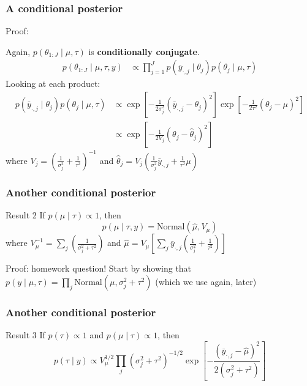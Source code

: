 \documentclass{beamer}
\begin{document}
\begin{frame}
\frametitle{A conditional posterior}

Proof:

Again, $p(\theta_{1:J} \mid \mu, \tau)$ is {\bf conditionally conjugate}. 
\begin{align*}
p(\theta_{1:J} \mid \mu, \tau, y) &\propto \prod_{j=1}^J p(\bar{y}_{\cdot,j} \mid \theta_j) p(\theta_j \mid \mu, \tau) 
\end{align*}
Looking at each product:
\begin{align*}
p(\bar{y}_{\cdot,j} \mid \theta_j) p(\theta_j \mid \mu, \tau) &\propto \exp\left[-\frac{1}{2 \sigma_j^2} \left(\bar{y}_{\cdot,j} - \theta_j \right)^2 \right]\exp\left[-\frac{1}{2 \tau^2} \left( \theta_j - \mu \right)^2 \right] \\
&\propto \exp\left[-\frac{1}{2 V_j}(\theta_j - \hat{\theta}_j)^2 \right]
\end{align*}
where $V_j = \left(\frac{1}{\sigma^2_j} + \frac{1}{\tau^2} \right)^{-1}$ and $\hat{\theta}_j = V_j\left(\frac{1}{\sigma^2_j} \bar{y}_{\cdot,j} + \frac{1}{\tau^2}\mu \right) $

\end{frame}

\begin{frame}
\frametitle{Another conditional posterior }

\begin{block}{Result 2}
If $p(\mu \mid \tau) \propto 1$, then
\[
p( \mu \mid \tau, y) = \text{Normal}(\hat{\mu}, V_{\mu})
\]
where $V_{\mu}^{-1} = \sum_{j} \left( \frac{1}{\sigma^2_j + \tau^2}\right)$  and $\hat{\mu} = V_{\mu} \left[ \sum_{j} \bar{y}_{\cdot,j}\left( \frac{1}{\sigma^2_j} + \frac{1}{\tau^2} \right) \right]$
\end{block}

Proof: homework question! Start by showing that $p(y \mid \mu, \tau) = \prod_j \text{Normal}(\mu, \sigma^2_j + \tau^2)$ (which we use again, later)


\end{frame}

\begin{frame}
\frametitle{Another conditional posterior }

\begin{block}{Result 3}
If $p(\tau) \propto 1$ and $p(\mu \mid \tau) \propto 1$, then
\[
p( \tau \mid y) \propto V_{\mu}^{1/2} \prod_{j} (\sigma^2_j + \tau^2)^{-1/2} \exp\left[ -\frac{ (\bar{y}_{\cdot,j} - \hat{\mu})^2 }{2(\sigma^2_j + \tau^2)}\right]
\]
\end{block}
\end{frame}
\end{document}
